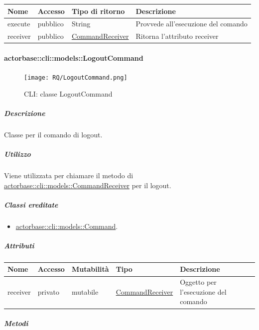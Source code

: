 \documentclass{scalatekids-article}
\begin{document}
\begin{tabular}{| l | l | l | l |}
  \hline
  Nome & Accesso & Tipo di ritorno & Descrizione\\
  \hline
  execute & pubblico & String & Provvede all'esecuzione del comando\\
  \hline
  receiver & pubblico & \hyperref[sec:actorbase::cli::models::CommandReceiver]{CommandReceiver} & Ritorna l'attributo receiver\\
  \hline
\end{tabular}

\paragraph{actorbase::cli::models::LogoutCommand}
\label{sec:actorbase::cli::models::LogoutCommand}

\begin{figure}[H]
  \begin{center}
    \texttt{[image: RQ/LogoutCommand.png]}
    \caption{CLI: classe LogoutCommand}
  \end{center}
\end{figure}

\subparagraph{Descrizione}

Classe per il comando di logout.

\subparagraph{Utilizzo}

Viene utilizzata per chiamare il metodo di
\hyperref[sec:actorbase::cli::models::CommandReceiver]{actorbase::cli::models::CommandReceiver} per il logout.

\subparagraph{Classi ereditate}

\begin{itemize}
\item \hyperref[sec:actorbase::cli::models::Command]{actorbase::cli::models::Command}.
\end{itemize}

\subparagraph{Attributi}

\begin{tabular}{| p{1cm} | p{1.5cm} | p{2cm} | p{4cm} | p{8.5cm} |}
  \hline
  Nome & Accesso & Mutabilità & Tipo & Descrizione\\
  \hline
  receiver & privato & mutabile & \hyperref[sec:actorbase::cli::models::CommandReceiver]{CommandReceiver} & Oggetto per l'esecuzione del comando\\
  \hline
\end{tabular}

\subparagraph{Metodi}
\end{document}
